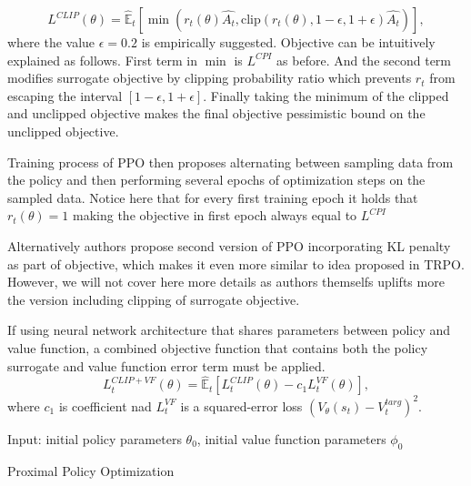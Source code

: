 \[
  L^{CLIP}(\theta) = \hat{\mathbb{E}}_t \left[ \min (r_t(\theta) \hat{A_t}, \textrm{clip} (r_t(\theta), 1-\epsilon, 1+\epsilon) \hat{A_t})\right],
\]
where the value $\epsilon = 0.2$ is empirically suggested. 
Objective can be intuitively explained as follows.
First term in $\min$ is $L^{CPI}$ as before.
And the second term modifies surrogate objective by clipping probability ratio which prevents $r_t$ from escaping the interval $[1-\epsilon, 1+ \epsilon]$.
Finally taking the minimum of the clipped and unclipped objective makes the final objective pessimistic bound on the unclipped objective.

Training process of PPO then proposes alternating between sampling data from the policy and then performing several epochs of optimization steps on the sampled data.
Notice here that for every first training epoch it holds that $r_t(\theta) = 1$ making the objective in first epoch always equal to $L^{CPI}$

Alternatively authors propose second version of PPO incorporating KL penalty as part of objective, which makes it even more similar to idea proposed in TRPO.
However, we will not cover here more details as authors themselfs uplifts more the version including clipping of surrogate objective.

If using neural network architecture that shares parameters between policy and value function, a combined objective function that contains both the policy surrogate and value function error term must be applied.
\[
  L_t^{CLIP+VF}(\theta) =   \hat{\mathbb{E}}_t \left[L_t^{CLIP}(\theta) - c_1 L_t^{VF}(\theta) \right],
\]
where $c_1$ is coefficient nad $L_t^{VF}$ is a squared-error loss $(V_\theta(s_t) - V_t^{targ})^2$.

\begin{algorithm}[]
  Input: initial policy parameters $\theta_0$, initial value function parameters $\phi_0$
  
  
  \caption{Proximal Policy Optimization}
  \label{PPO}
\end{algorithm}

